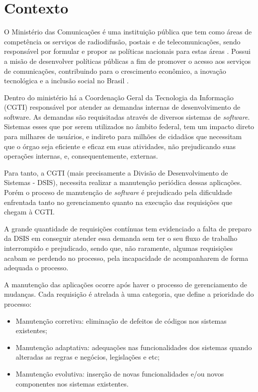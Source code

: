 
\chapter[Contexto]{Contexto}

O Ministério das Comunicações é uma instituição pública que tem como áreas de competência os serviços de radiodifusão, postais e de telecomunicações, sendo responsável por formular e propor as políticas nacionais para estas áreas \cite{mcsite001}. Possui a misão de desenvolver políticas públicas a fim de promover o acesso aos serviços de comunicações, contribuindo para o crescimento econômico, a inovação tecnológica e a inclusão social no Brasil \cite{mcsite001}.

Dentro do ministério há a Coordenação Geral da Tecnologia da Informação (CGTI) responsável por atender as demandas internas de desenvolvimento de software. As demandas são requisitadas através de diversos sistemas de \emph{software}. Sistemas esses que por serem utilizados no âmbito federal, tem um impacto direto para milhares de usuários, e indireto para milhões de cidadãos que necessitam que o órgao seja eficiente e eficaz em suas atividades, não prejudicando suas operações internas, e, consequentemente, externas.

Para tanto, a CGTI (mais precisamente a Divisão de Desenvolvimento de Sistemas - DSIS), necessita realizar a manutenção periódica dessas aplicações. Porém o proceso de manutenção de \emph{software} é prejudicado pela dificuldade enfrentada tanto no gerenciamento quanto na execução das requisições que chegam à CGTI.

A grande quantidade de requisições contínuas tem evidenciado a falta de preparo da DSIS em conseguir atender essa demanda sem ter o seu fluxo de trabalho interrompido e prejudicado, sendo que, não raramente, algumas requisições acabam se perdendo no processo, pela incapacidade de acompanharem de forma adequada o processo.

A manutenção das aplicações ocorre após haver o processo de gerenciamento de mudanças. Cada requisição é atrelada à uma categoria, que define a prioridade do processo:

\begin{itemize}
  \item Manutenção corretiva: eliminação de defeitos de códigos nos sistemas existentes;
  \item Manutenção adaptativa: adequações nas funcionalidades dos sistemas quando alteradas as regras e negócios, legislações e etc;
  \item Manutenção evolutiva: inserção de novas funcionalidades e/ou novos componentes nos sistemas existentes.
\end{itemize}

